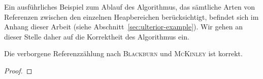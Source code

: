 Ein ausführliches Beispiel zum Ablauf des Algorithmus, das sämtliche Arten von Referenzen zwischen den einzelnen Heapbereichen berücksichtigt, befindet sich im Anhang dieser Arbeit (siehe Abschnitt~\ref{sec:ulterior-example}).
Wir gehen an dieser Stelle daher auf die Korrektheit des Algorithmus ein.

\begin{mybox}
\begin{satz}
	Die verborgene Referenzzählung nach \textsc{Blackburn} und \textsc{McKinley} ist korrekt.
\end{satz}
\end{mybox}

\begin{proof}
	
\end{proof}
